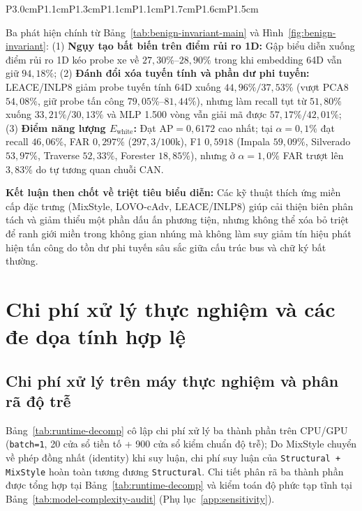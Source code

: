 \documentclass[12pt, a4paper, reqno, oneside]{book}
\DeclareRobustCommand{\code}[1]{\nolinkurl{#1}}
\begin{document}
{\begin{table}[htbp]
\begin{tabular}{P{3.0cm}P{1.1cm}P{1.3cm}P{1.1cm}P{1.1cm}P{1.7cm}P{1.6cm}P{1.5cm}}
\bottomrule
\end{tabular}
\end{table}}

Ba phát hiện chính từ Bảng~\ref{tab:benign-invariant-main} và Hình~\ref{fig:benign-invariant}: (1) \textbf{Ngụy tạo bất biến trên điểm rủi ro 1D:} Gập biểu diễn xuống điểm rủi ro 1D kéo probe xe về $27{,}30\%\text{--}28{,}90\%$ trong khi embedding 64D vẫn giữ $94{,}18\%$; (2) \textbf{Đánh đổi xóa tuyến tính và phần dư phi tuyến:} LEACE/INLP8 giảm probe tuyến tính 64D xuống $44{,}96\%/37{,}53\%$ (vượt PCA8 $54{,}08\%$, giữ probe tấn công $79{,}05\%\text{--}81{,}44\%$), nhưng làm recall tụt từ $51{,}80\%$ xuống $33{,}21\%/30{,}13\%$ và MLP 1.500 vòng vẫn giải mã được $57{,}17\%/42{,}01\%$; (3) \textbf{Điểm năng lượng $E_{\text{white}}$:} Đạt $\text{AP}=0{,}6172$ cao nhất; tại $\alpha=0{,}1\%$ đạt recall $46{,}06\%$, FAR $0{,}297\%$ ($297{,}3/100\text{k}$), F1 $0{,}5918$ (Impala $59{,}09\%$, Silverado $53{,}97\%$, Traverse $52{,}33\%$, Forester $18{,}85\%$), nhưng ở $\alpha=1{,}0\%$ FAR trượt lên $3{,}83\%$ do tự tương quan chuỗi CAN.

\noindent\textbf{Kết luận then chốt về triệt tiêu biểu diễn:} Các kỹ thuật thích ứng miền cấp đặc trưng (MixStyle, LOVO-cAdv, LEACE/INLP8) giúp cải thiện biên phân tách và giảm thiểu một phần dấu ấn phương tiện, nhưng không thể xóa bỏ triệt để ranh giới miền trong không gian nhúng mà không làm suy giảm tín hiệu phát hiện tấn công do tồn dư phi tuyến sâu sắc giữa cấu trúc bus và chữ ký bất thường.

\section{Chi phí xử lý thực nghiệm và các đe dọa tính hợp lệ}
\subsection{Chi phí xử lý trên máy thực nghiệm và phân rã độ trễ}\label{sec:runtime}
Bảng~\ref{tab:runtime-decomp} cô lập chi phí xử lý ba thành phần trên CPU/GPU (\code{batch=1}, 20 cửa sổ tiền tố + 900 cửa sổ kiểm chuẩn độ trễ); Do MixStyle chuyển về phép đồng nhất (identity) khi suy luận, chi phí suy luận của \code{Structural + MixStyle} hoàn toàn tương đương \code{Structural}. Chi tiết phân rã ba thành phần được tổng hợp tại Bảng~\ref{tab:runtime-decomp} và kiểm toán độ phức tạp tĩnh tại Bảng~\ref{tab:model-complexity-audit} (Phụ lục~\ref{app:sensitivity}).
\end{document}
